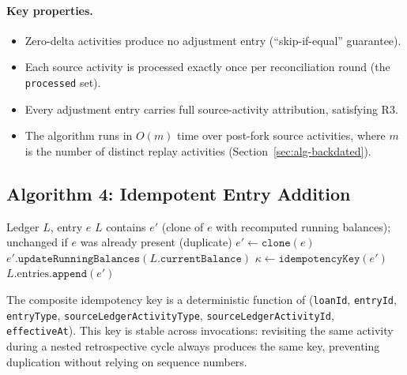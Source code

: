 \documentclass[11pt,letterpaper]{article}
\begin{document}
\paragraph{Key properties.}
\begin{itemize}
  \item Zero-delta activities produce no adjustment entry
        (``skip-if-equal'' guarantee).
  \item Each source activity is processed exactly once per
        reconciliation round (the \texttt{processed} set).
  \item Every adjustment entry carries full source-activity attribution,
        satisfying R3.
  \item The algorithm runs in $O(m)$ time over post-fork source activities,
        where $m$ is the number of distinct replay activities
        (Section~\ref{sec:alg-backdated}).
\end{itemize}

\subsection{Algorithm 4: Idempotent Entry Addition}
\label{sec:alg-idempotent}

\begin{algorithm}[H]
\caption{Idempotent Entry Addition}
\label{alg:addentry}
\begin{algorithmic}[1]
\Require Ledger $L$, entry $e$
\Ensure $L$ contains $e'$ (clone of $e$ with recomputed running balances); unchanged if $e$ was already present (duplicate)
\State $e' \leftarrow \texttt{clone}(e)$
\State $e'.\texttt{updateRunningBalances}(L.\texttt{currentBalance})$
\State $\kappa \leftarrow \texttt{idempotencyKey}(e')$
  \State \Return {}
\EndIf
\State $L.\text{entries}.\texttt{append}(e')$
\end{algorithmic}
\end{algorithm}

The composite idempotency key is a deterministic function of
(\texttt{loanId}, \texttt{entryId}, \texttt{entryType},
\texttt{sourceLedgerActivityType}, \texttt{sourceLedgerActivityId},
\texttt{effectiveAt}). This key is stable across invocations: revisiting
the same activity during a nested retrospective cycle always produces
the same key, preventing duplication without relying on sequence numbers.

\end{document}
